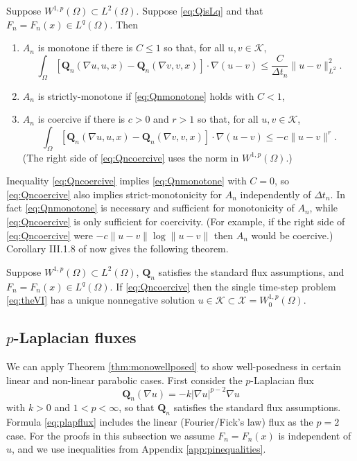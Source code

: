 \documentclass[final,onefignum]{siamart190516}
\newcommand\bQ{\mathbf{Q}}
\newcommand{\grad}{\nabla}
\begin{document}
\begin{lemma}  \label{lem:monotonecoercive}  Suppose $W^{1,p}(\Omega) \subset L^2(\Omega)$.  Suppose \eqref{eq:QisLq} and that $F_n=F_n(x) \in L^q(\Omega)$.  Then
\renewcommand{\labelenumi}{(\roman{enumi})}
\begin{enumerate}
\item  $A_n$ is monotone if there is $C\le 1$ so that, for all $u,v \in \mathcal{K}$,
\begin{equation}
\int_\Omega \left[\bQ_n(\grad u,u,x) - \bQ_n(\grad v,v,x)\right] \cdot \grad(u-v) \le \frac{C}{\Delta t_n} \|u-v\|_{L^2}^2. \label{eq:Qnmonotone}
\end{equation}
\item  $A_n$ is strictly-monotone if \eqref{eq:Qnmonotone} holds with $C<1$,
\item  $A_n$ is coercive if there is $c>0$ and $r>1$ so that, for all $u,v \in \mathcal{K}$,
\begin{equation}
\int_\Omega \left[\bQ_n(\grad u,u,x) - \bQ_n(\grad v,v,x)\right] \cdot \grad(u-v) \le - c \|u-v\|^r. \label{eq:Qncoercive}
\end{equation}
(The right side of \eqref{eq:Qncoercive} uses the norm in $W^{1,p}(\Omega)$.)
\end{enumerate}
\end{lemma}

Inequality \eqref{eq:Qncoercive} implies \eqref{eq:Qnmonotone} with $C=0$, so \eqref{eq:Qncoercive} also implies strict-monotonicity for $A_n$ independently of $\Delta t_n$.  In fact \eqref{eq:Qnmonotone} is necessary and sufficient for monotonicity of $A_n$, while \eqref{eq:Qncoercive} is only sufficient for coercivity.  (For example, if the right side of \eqref{eq:Qncoercive} were $- c \|u-v\| \log \|u-v\|$ then $A_n$ would be coercive.)  Corollary III.1.8 of \cite{KinderlehrerStampacchia1980} now gives the following theorem.

\begin{theorem}  \label{thm:monowellposed}  Suppose $W^{1,p}(\Omega) \subset L^2(\Omega)$, $\bQ_n$ satisfies the standard flux assumptions, and $F_n=F_n(x)\in L^q(\Omega)$.  If \eqref{eq:Qncoercive} then the single time-step problem \eqref{eq:theVI} has a unique nonnegative solution $u\in\mathcal{K} \subset \mathcal{X}=W_0^{1,p}(\Omega)$.
\end{theorem}

\subsection{$p$-Laplacian fluxes} \label{subsec:plap}  We can apply Theorem \ref{thm:monowellposed} to show well-posedness in certain linear and non-linear parabolic cases.  First consider the $p$-Laplacian \cite{Evans2010} flux
\begin{equation}
  \bQ_n(\grad u) = - k |\grad u|^{p-2} \grad u \label{eq:plapflux}
\end{equation}
with $k>0$ and $1<p<\infty$, so that $\bQ_n$ satisfies the standard flux assumptions.  Formula \eqref{eq:plapflux} includes the linear (Fourier/Fick's law) flux as the $p=2$ case.  For the proofs in this subsection we assume $F_n=F_n(x)$ is independent of $u$, and we use inequalities from Appendix \ref{app:pinequalities}.
\end{document}

